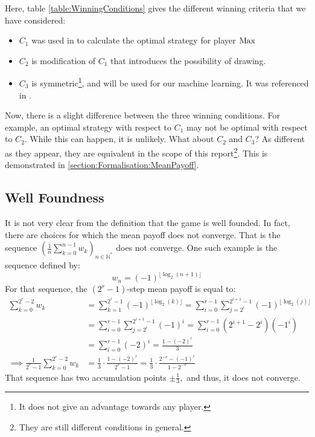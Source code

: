 Here, table \ref{table:WinningConditions} gives the different winning criteria that we have considered:
\begin{itemize}
	\item $C_1$ was used in \cite{MPGMaxAtom} to calculate the optimal strategy for player $\operatorname{Max}$
	\item $C_2$ is modification of $C_1$ that introduces the possibility of drawing.
	\item $C_3$ is symmetric\footnote{It does not give an advantage towards any player.}, and will be used for our machine learning. It was referenced in \cite{TropicalCSP}.
\end{itemize}
Now, there is a slight difference between the three winning conditions.
\newline For example, an optimal strategy with respect to $C_1$ may not be optimal with respect to $C_2$. While this can happen, it is unlikely.
\newline What about $C_2$ and $C_3$? As different as they appear, they are equivalent in the scope of this report\footnote{They are still different conditions in general.}.
This is demonstrated in \ref{section:Formalisation:MeanPayoff}.
\subsection{Well Foundness}
It is not very clear from the definition that the game is well founded. \newline
In fact, there are choices for which the mean payoff does not converge. That is the sequence $\left(\frac{1}{n}\sum_{k=0}^{n-1} w_k \right)_{n\in\mathbb{N}^*}$ does not converge. \newline One such example is the sequence defined by:
$$
w_n=(-1)^{\lfloor  \log_2 (n+1)\rfloor}
$$
For that sequence, the $(2^r-1)$-step mean payoff is equal to:
\begin{align*}
	\sum_{k=0}^{2^r-2} w_k &= 	\sum_{k=1}^{2^r-1}(-1)^{\lfloor  \log_2 (k)\rfloor} = \sum_{i=0}^{r-1}\sum_{j=2^{i}}^{2^{i+1}-1}(-1)^{\lfloor  \log_2 (j)\rfloor} \\
	&=\sum_{i=0}^{r-1}\sum_{j=2^{i}}^{2^{i+1}-1}(-1)^i =\sum_{i=0}^{r-1}(2^{i+1}-2^i)(-1^i) \\
	&=\sum_{i=0}^{r-1}(-2)^i = \frac{1-(-2)^r}{3} \\
	\implies \frac{1}{2^r-1}\sum_{k=0}^{2^r-2} w_k  &= \frac{1}{3} \cdot \frac{1-(-2)^r}{2^r-1} = \frac{1}{3} \cdot \frac{2^{-r}-(-1)^r}{1-2^{-r}}
\end{align*}
That sequence has two accumulation points $\pm \frac{1}{3},$ and thus, it does not converge.


